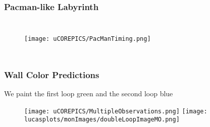 \documentclass{beamer}
\begin{document}
\begin{frame}
\frametitle{Pacman-like Labyrinth}




\begin{columns}[c]

\begin{figure}
\texttt{[image: uCOREPICS/PacManTiming.png]}
\end{figure}

\begin{itemize}

\end{itemize}



\begin{figure}
\centering
{}\par\medskip
{}\par\medskip        
\end{figure}

\end{columns}


\end{frame}


\begin{frame}
\frametitle{Wall Color Predictions}
We paint the first loop green and the second loop blue
\begin{figure}
\texttt{[image: uCOREPICS/MultipleObservations.png]}
\texttt{[image: lucasplots/monImages/doubleLoopImageMO.png]}

\end{figure}

\begin{itemize}

\end{itemize}

\end{frame}
\end{document}
